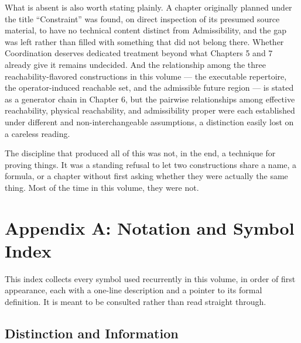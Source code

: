 \documentclass[12pt]{report}
\begin{document}
What is absent is also worth stating plainly. A
chapter originally planned under the title ``Constraint'' was found, on
direct inspection of its presumed source material, to have no technical
content distinct from Admissibility, and the gap was left rather than
filled with something that did not belong there. Whether Coordination
deserves dedicated treatment beyond what Chapters 5 and 7 already give it
remains undecided. And the relationship among the three
reachability-flavored constructions in this volume --- the executable repertoire, the
operator-induced reachable set, and the admissible future region --- is
stated as a generator chain in Chapter 6, but the pairwise relationships
among effective reachability, physical reachability, and admissibility
proper were each established under different and non-interchangeable
assumptions, a distinction easily lost on a careless reading.

The discipline that produced all of this was not, in the end, a
technique for proving things. It was a standing refusal to let two
constructions share a name, a formula, or a chapter without first asking
whether they were actually the same thing. Most of the time in this
volume, they were not.






\chapter*{Appendix A: Notation and Symbol Index}

This index collects every symbol used recurrently in this volume, in
order of first appearance, each with a one-line description and a
pointer to its formal definition. It is meant to be consulted rather
than read straight through.

\section*{Distinction and Information}
\end{document}
